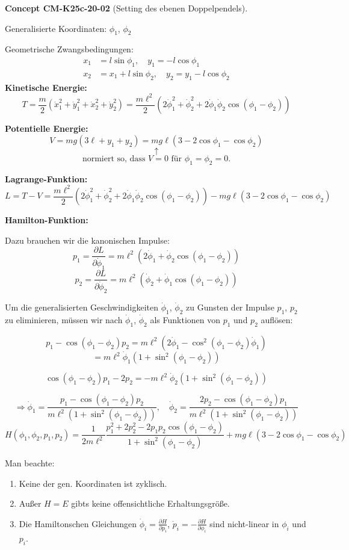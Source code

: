 \documentclass[10pt, letterpaper]{article}
\newcommand{\CustomHeading}[3]{%
  \par\medskip\noindent%
  \textbf{#1 #2} \textnormal{(#3)}.\enskip%
}
\newenvironment{CONC}[2]{\CustomHeading{Concept}{#1}{#2}}{}
\begin{document}
\begin{CONC}{CM-K25c-20-02}{Setting des ebenen Doppelpendels}
Generalisierte Koordinaten: $\phi_1$, $\phi_2$

Geometrische Zwangsbedingungen:
\begin{align*}
x_1 &= l\sin\phi_1, \quad y_1=-l\cos\phi_1\\
x_2 &= x_1+l\sin\phi_2, \quad y_2=y_1-l\cos\phi_2
\end{align*}
\noindent\textbf{Kinetische Energie:}
\[T= \frac{m}{2}(\dot{x}_1^2 + \dot{y}_1^2 + \dot{x}_2^2 + \dot{y}_2^2) = \frac{m\ell^2}{2}(2\dot{\phi}_1^2 + \dot{\phi}_2^2 + 2\dot{\phi}_1\dot{\phi}_2\cos(\phi_1-\phi_2))\]

\noindent\textbf{Potentielle Energie:}
\[V = mg(3\ell + y_1 + y_2) = mg\ell(3-2\cos\phi_1-\cos\phi_2)\]
\[\uparrow\]
\[\text{normiert so, dass }V=0\text{ für }\phi_1=\phi_2=0.\]

\noindent\textbf{Lagrange-Funktion:}
\[L = T-V = \frac{m\ell^2}{2}(2\dot{\phi}_1^2 + \dot{\phi}_2^2 + 2\dot{\phi}_1\dot{\phi}_2\cos(\phi_1-\phi_2)) - mg\ell(3-2\cos\phi_1-\cos\phi_2)\]

\noindent\textbf{Hamilton-Funktion:}

Dazu brauchen wir die kanonischen Impulse:
\[p_1 = \frac{\partial L}{\partial\dot{\phi}_1} = m\ell^2(2\dot{\phi}_1 + \dot{\phi}_2\cos(\phi_1-\phi_2))\]
\[p_2 = \frac{\partial L}{\partial\dot{\phi}_2} = m\ell^2(\dot{\phi}_2 + \dot{\phi}_1\cos(\phi_1-\phi_2))\]

Um die generalisierten Geschwindigkeiten $\dot{\phi}_1$, $\dot{\phi}_2$ zu Gunsten der Impulse $p_1$, $p_2$ zu eliminieren, müssen wir nach $\dot{\phi}_1$, $\dot{\phi}_2$ als Funktionen von $p_1$ und $p_2$ auflösen:

\[p_1-\cos(\phi_1-\phi_2)p_2 = m\ell^2(2\dot{\phi}_1-\cos^2(\phi_1-\phi_2)\dot{\phi}_1)\]
\[= m\ell^2\dot{\phi}_1(1+\sin^2(\phi_1-\phi_2))\]

\[\cos(\phi_1-\phi_2)p_1-2p_2 = -m\ell^2\dot{\phi}_2(1+\sin^2(\phi_1-\phi_2))\]

\[\Rightarrow \dot{\phi}_1 = \frac{p_1-\cos(\phi_1-\phi_2)p_2}{m\ell^2(1+\sin^2(\phi_1-\phi_2))}, \quad \dot{\phi}_2 = \frac{2p_2-\cos(\phi_1-\phi_2)p_1}{m\ell^2(1+\sin^2(\phi_1-\phi_2))}\]
\[H(\phi_1, \phi_2, p_1, p_2) = \frac{1}{2m\ell^2}\frac{p_1^2 + 2p_2^2 - 2p_1p_2\cos(\phi_1-\phi_2)}{1 + \sin^2(\phi_1-\phi_2)} + mg\ell(3-2\cos\phi_1-\cos\phi_2)\]

Man beachte:
\begin{enumerate}
\item Keine der gen. Koordinaten ist zyklisch.
\item Außer $H=E$ gibts keine offensichtliche Erhaltungsgröße.
\item Die Hamiltonschen Gleichungen $\dot{\phi}_i = \frac{\partial H}{\partial p_i}$, $\dot{p}_i = -\frac{\partial H}{\partial \phi_i}$ sind nicht-linear in $\phi_i$ und $p_i$.
\end{enumerate}
\end{CONC}
\end{document}
